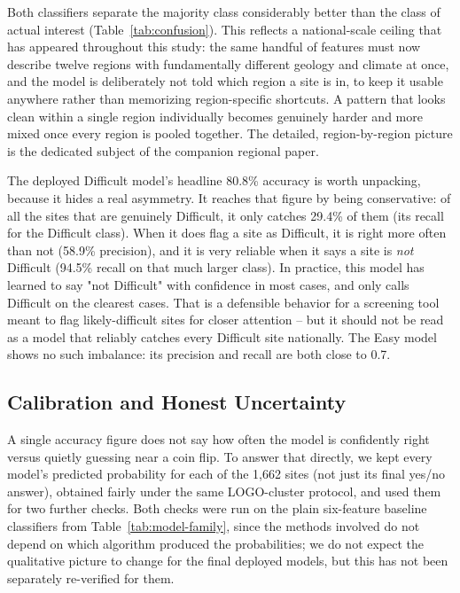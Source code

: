 \documentclass[11pt,a4paper]{article}
\begin{document}
Both classifiers separate the majority class considerably better than the class of actual interest (Table~\ref{tab:confusion}). This reflects a national-scale ceiling that has appeared throughout this study: the same handful of features must now describe twelve regions with fundamentally different geology and climate at once, and the model is deliberately not told which region a site is in, to keep it usable anywhere rather than memorizing region-specific shortcuts. A pattern that looks clean within a single region individually becomes genuinely harder and more mixed once every region is pooled together. The detailed, region-by-region picture is the dedicated subject of the companion regional paper.

The deployed Difficult model's headline 80.8\% accuracy is worth unpacking, because it hides a real asymmetry. It reaches that figure by being conservative: of all the sites that are genuinely Difficult, it only catches 29.4\% of them (its recall for the Difficult class). When it does flag a site as Difficult, it is right more often than not (58.9\% precision), and it is very reliable when it says a site is \emph{not} Difficult (94.5\% recall on that much larger class). In practice, this model has learned to say "not Difficult" with confidence in most cases, and only calls Difficult on the clearest cases. That is a defensible behavior for a screening tool meant to flag likely-difficult sites for closer attention -- but it should not be read as a model that reliably catches every Difficult site nationally. The Easy model shows no such imbalance: its precision and recall are both close to 0.7.

\subsection{Calibration and Honest Uncertainty}
\label{sec:calibration}
A single accuracy figure does not say how often the model is confidently right versus quietly guessing near a coin flip. To answer that directly, we kept every model's predicted probability for each of the 1{,}662 sites (not just its final yes/no answer), obtained fairly under the same LOGO-cluster protocol, and used them for two further checks. Both checks were run on the plain six-feature baseline classifiers from Table~\ref{tab:model-family}, since the methods involved do not depend on which algorithm produced the probabilities; we do not expect the qualitative picture to change for the final deployed models, but this has not been separately re-verified for them.
\end{document}
